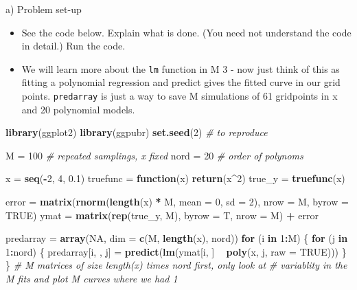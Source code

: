 \documentclass[ignorenonframetext,]{beamer}
\newenvironment{Shaded}{\begin{snugshade}}{\end{snugshade}}
\newcommand{\KeywordTok}[1]{\textcolor[rgb]{0.13,0.29,0.53}{\textbf{#1}}}
\newcommand{\DataTypeTok}[1]{\textcolor[rgb]{0.13,0.29,0.53}{#1}}
\newcommand{\DecValTok}[1]{\textcolor[rgb]{0.00,0.00,0.81}{#1}}
\newcommand{\FloatTok}[1]{\textcolor[rgb]{0.00,0.00,0.81}{#1}}
\newcommand{\StringTok}[1]{\textcolor[rgb]{0.31,0.60,0.02}{#1}}
\newcommand{\CommentTok}[1]{\textcolor[rgb]{0.56,0.35,0.01}{\textit{#1}}}
\newcommand{\OtherTok}[1]{\textcolor[rgb]{0.56,0.35,0.01}{#1}}
\newcommand{\ControlFlowTok}[1]{\textcolor[rgb]{0.13,0.29,0.53}{\textbf{#1}}}
\newcommand{\OperatorTok}[1]{\textcolor[rgb]{0.81,0.36,0.00}{\textbf{#1}}}
\newcommand{\NormalTok}[1]{#1}
\providecommand{\tightlist}{%
  \setlength{\itemsep}{0pt}\setlength{\parskip}{0pt}}
\begin{document}
\begin{frame}[fragile]

\begin{block}{a) Problem set-up}

\begin{itemize}
\tightlist
\item
  See the code below. Explain what is done. (You need not understand the
  code in detail.) Run the code.
\item
  We will learn more about the \texttt{lm} function in M 3 - now just
  think of this as fitting a polynomial regression and predict gives the
  fitted curve in our grid points. \texttt{predarray} is just a way to
  save M simulations of 61 gridpoints in x and 20 polynomial models.
\end{itemize}

\begin{Shaded}
\begin{Highlighting}[]
\KeywordTok{library}\NormalTok{(ggplot2)}
\KeywordTok{library}\NormalTok{(ggpubr)}
\KeywordTok{set.seed}\NormalTok{(}\DecValTok{2}\NormalTok{)  }\CommentTok{# to reproduce}

\NormalTok{M =}\StringTok{ }\DecValTok{100}  \CommentTok{# repeated samplings, x fixed }
\NormalTok{nord =}\StringTok{ }\DecValTok{20}  \CommentTok{# order of polynoms}


\NormalTok{x =}\StringTok{ }\KeywordTok{seq}\NormalTok{(}\OperatorTok{-}\DecValTok{2}\NormalTok{, }\DecValTok{4}\NormalTok{, }\FloatTok{0.1}\NormalTok{)}
\NormalTok{truefunc =}\StringTok{ }\ControlFlowTok{function}\NormalTok{(x) }\KeywordTok{return}\NormalTok{(x}\OperatorTok{^}\DecValTok{2}\NormalTok{)}
\NormalTok{true_y =}\StringTok{ }\KeywordTok{truefunc}\NormalTok{(x)}

\NormalTok{error =}\StringTok{ }\KeywordTok{matrix}\NormalTok{(}\KeywordTok{rnorm}\NormalTok{(}\KeywordTok{length}\NormalTok{(x) }\OperatorTok{*}\StringTok{ }\NormalTok{M, }\DataTypeTok{mean =} \DecValTok{0}\NormalTok{, }\DataTypeTok{sd =} \DecValTok{2}\NormalTok{), }\DataTypeTok{nrow =}\NormalTok{ M, }\DataTypeTok{byrow =} \OtherTok{TRUE}\NormalTok{)}
\NormalTok{ymat =}\StringTok{ }\KeywordTok{matrix}\NormalTok{(}\KeywordTok{rep}\NormalTok{(true_y, M), }\DataTypeTok{byrow =}\NormalTok{ T, }\DataTypeTok{nrow =}\NormalTok{ M) }\OperatorTok{+}\StringTok{ }\NormalTok{error}

\NormalTok{predarray =}\StringTok{ }\KeywordTok{array}\NormalTok{(}\OtherTok{NA}\NormalTok{, }\DataTypeTok{dim =} \KeywordTok{c}\NormalTok{(M, }\KeywordTok{length}\NormalTok{(x), nord))}
\ControlFlowTok{for}\NormalTok{ (i }\ControlFlowTok{in} \DecValTok{1}\OperatorTok{:}\NormalTok{M) \{}
    \ControlFlowTok{for}\NormalTok{ (j }\ControlFlowTok{in} \DecValTok{1}\OperatorTok{:}\NormalTok{nord) \{}
\NormalTok{        predarray[i, , j] =}\StringTok{ }\KeywordTok{predict}\NormalTok{(}\KeywordTok{lm}\NormalTok{(ymat[i, ] }\OperatorTok{~}\StringTok{ }\KeywordTok{poly}\NormalTok{(x, j, }\DataTypeTok{raw =} \OtherTok{TRUE}\NormalTok{)))}
\NormalTok{    \}}
\NormalTok{\}}
\CommentTok{# M matrices of size length(x) times nord first, only look at}
\CommentTok{# variablity in the M fits and plot M curves where we had 1}


\end{Highlighting}
\end{Shaded}
\end{block}
\end{frame}
\end{document}
